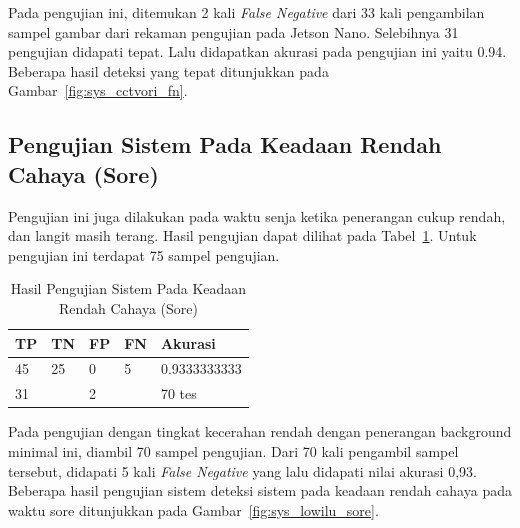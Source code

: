 \par Pada pengujian ini, ditemukan 2 kali \emph{False Negative} dari 33 kali pengambilan sampel gambar dari rekaman pengujian pada Jetson Nano. Selebihnya 31 pengujian didapati tepat. Lalu didapatkan akurasi pada pengujian ini yaitu 0.94. Beberapa hasil deteksi yang tepat ditunjukkan pada Gambar~\ref{fig:sys_cctvori_fn}.

\subsection{Pengujian Sistem Pada Keadaan Rendah Cahaya (Sore)}
\label{subsec:systest_test_lowilu_sore}

\par Pengujian ini juga dilakukan pada waktu senja ketika penerangan cukup rendah, dan langit masih terang. Hasil pengujian dapat dilihat pada Tabel~\ref{tb:systest_lowillum_dusk}. Untuk pengujian ini terdapat 75 sampel pengujian.

\begin{table}
    \centering
    \caption{Hasil Pengujian Sistem Pada Keadaan Rendah Cahaya (Sore)}
    \label{tb:systest_lowillum_dusk}
    \begin{tabular}{|l|l|l|l|l|} 
        \hline
        TP & TN                    & FP & FN                & Akurasi         \\ 
        \hline
        45 & 25                    & 0  & 5                 & 0.9333333333    \\ 
        \hline
        \multicolumn{2}{|l|}{31}   & \multicolumn{2}{l|}{2} & 70 tes \\
        \hline
    \end{tabular}
\end{table}

\par Pada pengujian dengan tingkat kecerahan rendah dengan penerangan background minimal ini, diambil 70 sampel pengujian. Dari 70 kali pengambil sampel tersebut, didapati 5 kali \emph{False Negative} yang lalu didapati nilai akurasi 0,93. Beberapa hasil pengujian sistem deteksi sistem pada keadaan rendah cahaya pada waktu sore ditunjukkan pada Gambar~\ref{fig:sys_lowilu_sore}.

